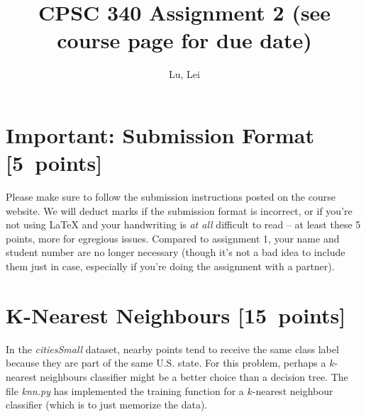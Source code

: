 \documentclass{article}
\newcommand{\blu}[1]{{\textcolor{blu}{#1}}}
\let\ask\blu
\newcommand\pts[1]{\textcolor{pointscolour}{[#1~points]}}
\begin{document}
    \title{CPSC 340 Assignment 2 (see course page for due date)}
    \author{Lu, Lei}
    \date{}
    \maketitle
    \vspace{-4em}


    \section*{Important: Submission Format \pts{5}}

    Please make sure to follow the submission instructions posted on the course website.
    \ask{We will deduct marks if the submission format is incorrect, or if you're not using \LaTeX{} and your handwriting is \emph{at all} difficult to read} -- at least these 5 points, more for egregious issues.
    Compared to assignment 1, your name and student number are no longer necessary (though it's not a bad idea to include them just in case, especially if you're doing the assignment with a partner).


    \section{K-Nearest Neighbours \pts{15}}

    In the \emph{citiesSmall} dataset, nearby points tend to receive the same class label because they are part of the same U.S. state. For this problem, perhaps a $k$-nearest neighbours classifier might be a better choice than a decision tree. The file \emph{knn.py} has implemented the training function for a $k$-nearest neighbour classifier (which is to just memorize the data).
\end{document}
